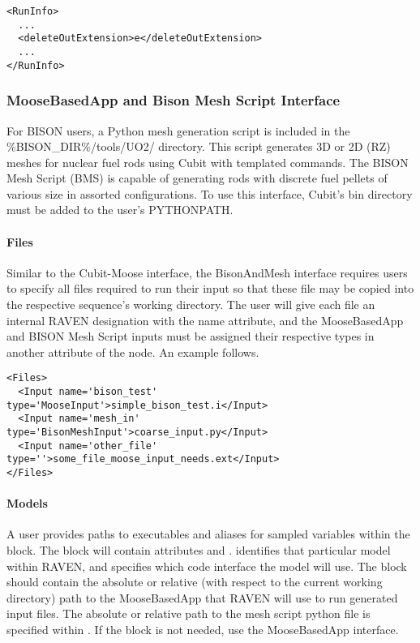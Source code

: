 \begin{lstlisting}[style=XML]
<RunInfo>
  ...
  <deleteOutExtension>e</deleteOutExtension>
  ...
</RunInfo>
\end{lstlisting}

\subsubsection{MooseBasedApp and Bison Mesh Script Interface}
For BISON users, a Python mesh generation script is included in
the \%BISON\_DIR\%/tools/UO2/ directory.  This script generates
3D or 2D (RZ) meshes for nuclear fuel rods using Cubit with
templated commands.  The BISON Mesh Script (BMS) is capable of
generating rods with discrete fuel pellets of various size in
assorted configurations.  To use this interface, Cubit's bin
directory must be added to the user's PYTHONPATH.

\paragraph{Files}
Similar to the Cubit-Moose interface, the BisonAndMesh interface
requires users to specify all files required to run their input
so that these file may be copied into the respective sequence's
working directory.  The user will give each file an internal
RAVEN designation with the name attribute, and the MooseBasedApp
and BISON Mesh Script inputs must be assigned their respective types
in another attribute of the  node.  An example follows.

\begin{lstlisting}[style=XML]
<Files>
  <Input name='bison_test' type='MooseInput'>simple_bison_test.i</Input>
  <Input name='mesh_in'    type='BisonMeshInput'>coarse_input.py</Input>
  <Input name='other_file' type=''>some_file_moose_input_needs.ext</Input>
</Files>
\end{lstlisting}

\paragraph{Models}
A user provides paths to executables and aliases for sampled variables within the
 block.  The  block will contain attributes  and
.   identifies that particular  model within RAVEN, and
 specifies which code interface the model will use. The 
block should contain the absolute or relative (with respect to the current working
directory) path to the MooseBasedApp that RAVEN will use to run generated input
files.  The absolute or relative path to the mesh script python file is specified within
.  If the  block is not needed, use the
MooseBasedApp interface.

